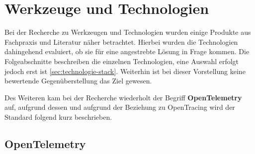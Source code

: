 
\section{Werkzeuge und Technologien}
\label{sec:werkzeuge-und-technologien}

%
%


Bei der Recherche zu Werkzeugen und Technologien wurden einige Produkte aus Fachpraxis und Literatur näher betrachtet. Hierbei wurden die Technologien dahingehend evaluiert, ob sie für eine angestrebte Lösung in Frage kommen. Die Folgeabschnitte beschreiben die einzelnen Technologien, eine Auswahl erfolgt jedoch erst ist \autoref{sec:technologie-stack}. Weiterhin ist bei dieser Vorstellung keine bewertende Gegenüberstellung das Ziel gewesen.

Des Weiteren kam bei der Recherche wiederholt der Begriff \textbf{OpenTelemetry} auf, aufgrund dessen und aufgrund der Beziehung zu OpenTracing wird der Standard folgend kurz beschrieben.

\newpage

\subsection{OpenTelemetry}

